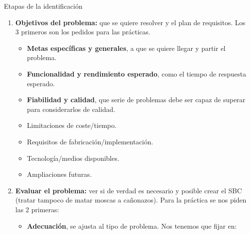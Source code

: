 \documentclass[12pt, twoside, openright]{report} %
\begin{document}
Etapas de la identificación
\begin{enumerate}
	\item \textbf{Objetivos del problema:} que se quiere resolver y el plan de requisitos. Los 3 primeros son los pedidos para las prácticas.
	      \begin{itemize}
		      \item \textbf{Metas específicas y generales}, a que se quiere llegar y partir el problema.
		      \item \textbf{Funcionalidad y rendimiento esperado}, como el tiempo de respuesta esperado.
		      \item \textbf{Fiabilidad y calidad}, que serie de problemas debe ser capaz de superar para considerarlos de calidad.
		      \item Limitaciones de coste/tiempo.
		      \item Requisitos de fabricación/implementación.
		      \item Tecnología/medios disponibles.
		      \item Ampliaciones futuras.
	      \end{itemize}
	\item \textbf{Evaluar el problema:} ver si de verdad es necesario y posible crear el SBC (tratar tampoco de matar moscas a cañonazos). Para la práctica se nos piden las 2 primeras:
	      \begin{itemize}
		      \item \textbf{Adecuación}, se ajusta al tipo de problema. Nos tenemos que fijar en:


\end{itemize}
\end{enumerate}
\end{document}
